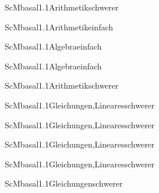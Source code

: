 \documentclass[12pt]{article}
\begin{document}
\begin{Add}{ScM}{basal1.1}{Arithmetik}{schwerer}
\end{Add}

\begin{Add}{ScM}{basal1.1}{Arithmetik}{einfach}
\end{Add}

\begin{Add}{ScM}{basal1.1}{Algebra}{einfach}
\end{Add}

\begin{Add}{ScM}{basal1.1}{Algebra}{einfach}
\end{Add}

\begin{Add}{ScM}{basal1.1}{Arithmetik}{schwerer}
\end{Add}

\begin{Add}{ScM}{basal1.1}{Gleichungen,Lineares}{schwerer}
\end{Add}

\begin{Add}{ScM}{basal1.1}{Gleichungen,Lineares}{schwerer}
\end{Add}

\begin{Add}{ScM}{basal1.1}{Gleichungen,Lineares}{schwerer}
\end{Add}

\begin{Add}{ScM}{basal1.1}{Gleichungen,Lineares}{schwerer}
\end{Add}

\begin{Add}{ScM}{basal1.1}{Gleichungen}{schwerer}
\end{Add}
\end{document}
